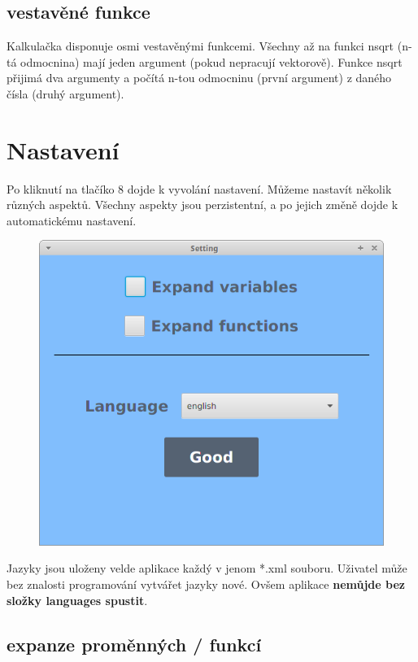 \documentclass[11pt, a4paper, titlepage]{article}
\begin{document}
	\subsection{vestavěné funkce}

	Kalkulačka disponuje osmi vestavěnými funkcemi. Všechny až na funkci nsqrt (n-tá odmocnina) mají 
	jeden argument (pokud nepracují vektorově). Funkce nsqrt přijimá dva argumenty a počítá n-tou odmocninu
	(první argument) z daného čísla (druhý argument).

	\section{Nastavení}

	Po kliknutí na tlačíko 8 dojde k vyvolání nastavení. Můžeme nastavít několik různých aspektů. Všechny aspekty jsou perzistentní, a po
	jejich změně dojde k automatickému nastavení.
	 
	\begin{figure}[h!]
	    \centering
	    \includegraphics[scale=0.5]{./assets/set.png}
	\end{figure}

	Jazyky jsou uloženy velde aplikace každý v jenom *.xml souboru. Uživatel může bez znalosti programování
	vytvářet jazyky nové. Ovšem aplikace \textbf{nemůjde bez složky languages spustit}.

	\subsection{expanze proměnných / funkcí}
\end{document}
